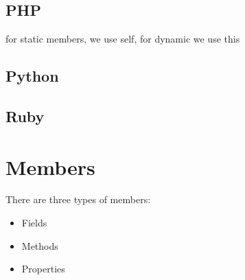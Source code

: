 \documentclass{KodeBook}
\begin{document}


\subsection{PHP}







for static members, we use self, for dynamic we use this

\subsection{Python}








\subsection{Ruby}







\section{Members}

There are three types of members: 
\begin{itemize}
	\item Fields
	\item Methods
	\item Properties
\end{itemize}
\end{document}
